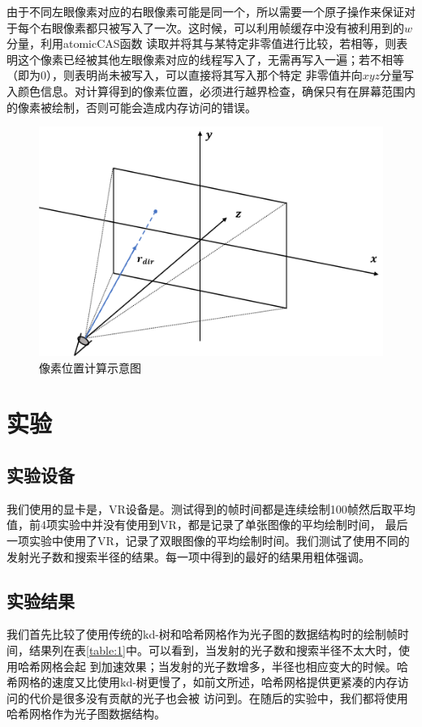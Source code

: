 \documentclass[UTF8]{ctexart}
\begin{document}
        由于不同左眼像素对应的右眼像素可能是同一个，所以需要一个原子操作来保证对于每个右眼像素都只被写入了一次。这时候，可以利用帧缓存中没有被利用到的$w$分量，利用atomicCAS函数
        读取并将其与某特定非零值进行比较，若相等，则表明这个像素已经被其他左眼像素对应的线程写入了，无需再写入一遍；若不相等（即为0），则表明尚未被写入，可以直接将其写入那个特定
        非零值并向$xyz$分量写入颜色信息。对计算得到的像素位置，必须进行越界检查，确保只有在屏幕范围内的像素被绘制，否则可能会造成内存访问的错误。
        
        \begin{figure}[htbp]
        \centering
        \includegraphics[scale=0.6]{pic/IndexCalculation.png}
        \caption{像素位置计算示意图}
        \label{fig:4}
        \end{figure}
\section{实验}
    \subsection{实验设备}
        我们使用的显卡是，VR设备是。测试得到的帧时间都是连续绘制100帧然后取平均值，前4项实验中并没有使用到VR，都是记录了单张图像的平均绘制时间，
        最后一项实验中使用了VR，记录了双眼图像的平均绘制时间。我们测试了使用不同的发射光子数和搜索半径的结果。每一项中得到的最好的结果用粗体强调。
    \subsection{实验结果}
        我们首先比较了使用传统的kd-树和哈希网格作为光子图的数据结构时的绘制帧时间，结果列在表\ref{table:1}中。可以看到，当发射的光子数和搜索半径不太大时，使用哈希网格会起
        到加速效果；当发射的光子数增多，半径也相应变大的时候。哈希网格的速度又比使用kd-树更慢了，如前文所述，哈希网格提供更紧凑的内存访问的代价是很多没有贡献的光子也会被
        访问到。在随后的实验中，我们都将使用哈希网格作为光子图数据结构。
        
\end{document}
